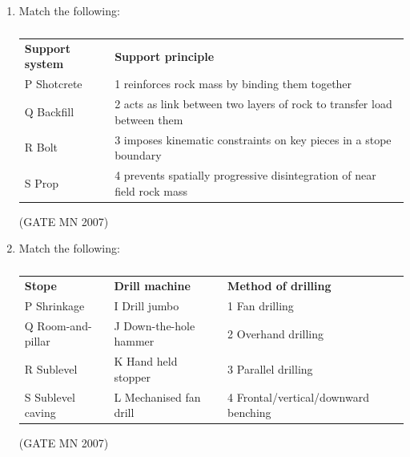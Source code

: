 \documentclass[journal]{IEEEtran}
\begin{document}
\begin{enumerate}
\item Match the following:
\begin{table}[H]
    \centering\normalsize
\begin{tabular}{p{5cm} p{5cm}}
\textbf{Support system} & \textbf{Support principle} \\
P \quad Shotcrete & 1 \quad reinforces rock mass by binding them together \\
Q \quad Backfill & 2 \quad acts as link between two layers of rock to transfer load between them \\
R \quad Bolt & 3 \quad imposes kinematic constraints on key pieces in a stope boundary \\
S \quad Prop & 4 \quad prevents spatially progressive disintegration of near field rock mass \\
\end{tabular}
 \caption*{}
    \label{tab:Q39}
\end{table}
\hfill (GATE MN 2007)
\begin{enumerate}
\end{enumerate}


\item Match the following:
\begin{table}[H]
    \centering\normalsize
\begin{tabular}{p{3cm} p{4cm} p{6cm}}
\textbf{Stope} & \textbf{Drill machine} & \textbf{Method of drilling} \\
P \quad Shrinkage & I \quad Drill jumbo & 1 \quad Fan drilling \\
Q \quad Room-and-pillar & J \quad Down-the-hole hammer & 2 \quad Overhand drilling \\
R \quad Sublevel & K \quad Hand held stopper & 3 \quad Parallel drilling \\
S \quad Sublevel caving & L \quad Mechanised fan drill & 4 \quad Frontal/vertical/downward benching \\
\end{tabular}
 \caption*{}
    \label{tab:Q40}
\end{table}
\hfill (GATE MN 2007)
\begin{enumerate}
\end{enumerate}




\end{enumerate}
\end{document}
